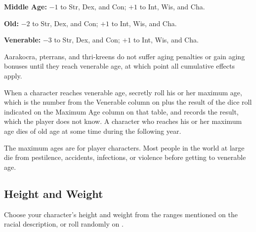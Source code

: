 \begin{itemize*}
\item \textbf{Middle Age:} $-1$ to Str, Dex, and Con; $+1$ to Int, Wis, and Cha.
\item \textbf{Old:} $-2$ to Str, Dex, and Con; $+1$ to Int, Wis, and Cha.
\item \textbf{Venerable:} $-3$ to Str, Dex, and Con; $+1$ to Int, Wis, and Cha.
\end{itemize*}

Aarakocra, pterrans, and thri-kreens do not suffer aging penalties or gain aging bonuses until they reach venerable age, at which point all cumulative effects apply.

When a character reaches venerable age, secretly roll his or her maximum age, which is the number from the Venerable column on  plus the result of the dice roll indicated on the Maximum Age column on that table, and records the result, which the player does not know. A character who reaches his or her maximum age dies of old age at some time during the following year.

The maximum ages are for player characters. Most people in the world at large die from pestilence, accidents, infections, or violence before getting to venerable age.


\subsection{Height and Weight}
Choose your character's height and weight from the ranges mentioned on the racial description, or roll randomly on .

